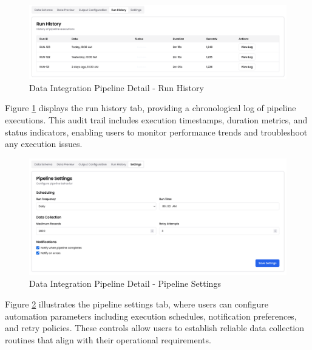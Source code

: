 \begin{figure}[h]
\centering
\includegraphics[width=1\textwidth]{assets/ui/data-pipelines-detailed-run-history.png}
\caption{Data Integration Pipeline Detail - Run History}
\label{fig:data-pipelines-detailed-run-history}
\end{figure}

Figure \ref{fig:data-pipelines-detailed-run-history} displays the run history tab, providing a chronological log of pipeline executions. This audit trail includes execution timestamps, duration metrics, and status indicators, enabling users to monitor performance trends and troubleshoot any execution issues.

\begin{figure}[h]
\centering
\includegraphics[width=1\textwidth]{assets/ui/data-pipelines-detailed-pipeline-setting.png}
\caption{Data Integration Pipeline Detail - Pipeline Settings}
\label{fig:data-pipelines-detailed-pipeline-setting}
\end{figure}

\pagebreak
Figure \ref{fig:data-pipelines-detailed-pipeline-setting} illustrates the pipeline settings tab, where users can configure automation parameters including execution schedules, notification preferences, and retry policies. These controls allow users to establish reliable data collection routines that align with their operational requirements.

